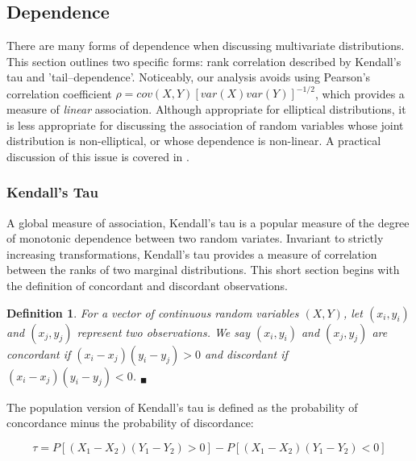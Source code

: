\documentclass[12pt]{article}
\newtheorem{defn}{Definition}
\begin{document}
\subsection{Dependence}

There are many forms of dependence when discussing multivariate distributions. This section outlines two specific forms: rank correlation described by Kendall's tau and 'tail--dependence'. Noticeably, our analysis avoids using Pearson's correlation coefficient $\rho = cov\left(X,Y\right)\left[var\left(X\right)var\left(Y\right)\right]^{-1/2}$, which provides a measure of \textit{linear} association. Although appropriate for elliptical distributions, it is less appropriate for discussing the association of random variables whose joint distribution is non-elliptical, or whose dependence is non-linear. A practical discussion of this issue is covered in \cite{Embrechts_McNeil_Straumann_2002}.

\subsubsection{Kendall's Tau}

A global measure of association, Kendall's tau is a popular measure of the degree of monotonic dependence between two random variates. Invariant to strictly increasing transformations, Kendall's tau provides a measure of correlation between the ranks of two marginal distributions. This short section begins with the definition of concordant and discordant observations.

\begin{defn}
	For a vector of continuous random variables $\left(X,Y\right)$, let $\left(x_{i},y_{i}\right)$ and $\left(x_{j},y_{j}\right)$ represent two observations. We say $\left(x_{i},y_{i}\right)$ and $\left(x_{j},y_{j}\right)$ are concordant if $\left(x_{i} - x_{j}\right)\left(y_{i}-y_{j}\right) > 0$ and discordant if $\left(x_{i}-x_{j}\right)\left(y_{i} - y_{j}\right) < 0$. $_{\blacksquare}$
\end{defn}

The population version of Kendall's tau is defined as the probability of concordance minus the probability of discordance:

\begin{equation}
	\tau = P\left[\left(X_{1} - X_{2}\right)\left(Y_{1} - Y_{2}\right) > 0\right] - P\left[\left(X_{1} - X_{2}\right)\left(Y_{1} - Y_{2}\right) < 0\right]
\end{equation}
\end{document}
